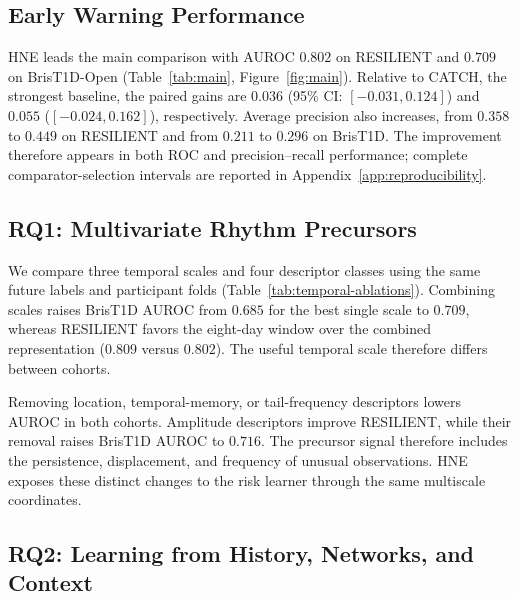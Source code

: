 
\subsection{Early Warning Performance}
\label{sec:results}
HNE leads the main comparison with AUROC $0.802$ on RESILIENT and $0.709$ on BrisT1D-Open (Table~\ref{tab:main}, Figure~\ref{fig:main}). Relative to CATCH, the strongest baseline, the paired gains are $0.036$ (95\% CI: $[-0.031,0.124]$) and $0.055$ ($[-0.024,0.162]$), respectively. Average precision also increases, from $0.358$ to $0.449$ on RESILIENT and from $0.211$ to $0.296$ on BrisT1D. The improvement therefore appears in both ROC and precision--recall performance; complete comparator-selection intervals are reported in Appendix~\ref{app:reproducibility}.




\subsection{RQ1: Multivariate Rhythm Precursors}
We compare three temporal scales and four descriptor classes using the same future labels and participant folds (Table~\ref{tab:temporal-ablations}). Combining scales raises BrisT1D AUROC from $0.685$ for the best single scale to $0.709$, whereas RESILIENT favors the eight-day window over the combined representation ($0.809$ versus $0.802$). The useful temporal scale therefore differs between cohorts.

\begin{table}[H]
\centering
\caption{Temporal scales and fluctuation descriptors under the same labels and participant folds.}
\label{tab:temporal-ablations}
\end{table}

Removing location, temporal-memory, or tail-frequency descriptors lowers AUROC in both cohorts. Amplitude descriptors improve RESILIENT, while their removal raises BrisT1D AUROC to $0.716$. The precursor signal therefore includes the persistence, displacement, and frequency of unusual observations. HNE exposes these distinct changes to the risk learner through the same multiscale coordinates.

\subsection{RQ2: Learning from History, Networks, and Context}

\begin{table}[H]
\centering
\caption{HNE module ablations on common origins. Human denotes Human Rhythms.}
\label{tab:ablations}
\end{table}


